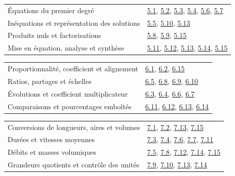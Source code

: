 \begin{tabularx}{\linewidth}{@{}Yl@{}}\toprule
Équations du premier degré & \hyperref[exo-5-1]{5.1}, \hyperref[exo-5-2]{5.2}, \hyperref[exo-5-3]{5.3}, \hyperref[exo-5-4]{5.4}, \hyperref[exo-5-6]{5.6}, \hyperref[exo-5-7]{5.7}\\[2mm]
Inéquations et représentation des solutions & \hyperref[exo-5-5]{5.5}, \hyperref[exo-5-10]{5.10}, \hyperref[exo-5-13]{5.13}\\[2mm]
Produits nuls et factorisations & \hyperref[exo-5-8]{5.8}, \hyperref[exo-5-9]{5.9}, \hyperref[exo-5-15]{5.15}\\[2mm]
Mise en équation, analyse et synthèse & \hyperref[exo-5-11]{5.11}, \hyperref[exo-5-12]{5.12}, \hyperref[exo-5-13]{5.13}, \hyperref[exo-5-14]{5.14}, \hyperref[exo-5-15]{5.15}\\[2mm]
\bottomrule\end{tabularx}\par\vspace{4mm}
\begin{tabularx}{\linewidth}{@{}Yl@{}}\toprule
Proportionnalité, coefficient et alignement & \hyperref[exo-6-1]{6.1}, \hyperref[exo-6-2]{6.2}, \hyperref[exo-6-15]{6.15}\\[2mm]
Ratios, partages et échelles & \hyperref[exo-6-5]{6.5}, \hyperref[exo-6-8]{6.8}, \hyperref[exo-6-9]{6.9}, \hyperref[exo-6-10]{6.10}\\[2mm]
Évolutions et coefficient multiplicateur & \hyperref[exo-6-3]{6.3}, \hyperref[exo-6-4]{6.4}, \hyperref[exo-6-6]{6.6}, \hyperref[exo-6-7]{6.7}\\[2mm]
Comparaisons et pourcentages emboîtés & \hyperref[exo-6-11]{6.11}, \hyperref[exo-6-12]{6.12}, \hyperref[exo-6-13]{6.13}, \hyperref[exo-6-14]{6.14}\\[2mm]
\bottomrule\end{tabularx}\par\vspace{4mm}
\clearpage
{}\fontsize{10}{13}\selectfont
{}\begin{tabularx}{\linewidth}{@{}Yl@{}}\toprule
Conversions de longueurs, aires et volumes & \hyperref[exo-7-1]{7.1}, \hyperref[exo-7-2]{7.2}, \hyperref[exo-7-13]{7.13}, \hyperref[exo-7-15]{7.15}\\[2mm]
Durées et vitesses moyennes & \hyperref[exo-7-3]{7.3}, \hyperref[exo-7-4]{7.4}, \hyperref[exo-7-6]{7.6}, \hyperref[exo-7-7]{7.7}, \hyperref[exo-7-11]{7.11}\\[2mm]
Débits et masses volumiques & \hyperref[exo-7-5]{7.5}, \hyperref[exo-7-8]{7.8}, \hyperref[exo-7-12]{7.12}, \hyperref[exo-7-14]{7.14}, \hyperref[exo-7-15]{7.15}\\[2mm]
Grandeurs quotients et contrôle des unités & \hyperref[exo-7-9]{7.9}, \hyperref[exo-7-10]{7.10}, \hyperref[exo-7-13]{7.13}, \hyperref[exo-7-14]{7.14}\\[2mm]
\bottomrule\end{tabularx}\par\vspace{4mm}
